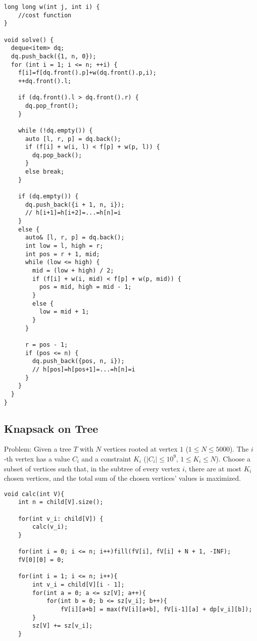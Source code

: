 \documentclass[11pt,a4paper]{article}
\begin{document}
\begin{multicols*}{2}
\begin{lstlisting}
long long w(int j, int i) {
    //cost function
}

void solve() {
  deque<item> dq;
  dq.push_back({1, n, 0});
  for (int i = 1; i <= n; ++i) {
    f[i]=f[dq.front().p]+w(dq.front().p,i);
    ++dq.front().l;

    if (dq.front().l > dq.front().r) {
      dq.pop_front();
    }

    while (!dq.empty()) {
      auto [l, r, p] = dq.back();
      if (f[i] + w(i, l) < f[p] + w(p, l)) {
        dq.pop_back();
      }
      else break;
    }

    if (dq.empty()) {
      dq.push_back({i + 1, n, i});
      // h[i+1]=h[i+2]=...=h[n]=i
    }
    else {
      auto& [l, r, p] = dq.back();
      int low = l, high = r;
      int pos = r + 1, mid;
      while (low <= high) {
        mid = (low + high) / 2;
        if (f[i] + w(i, mid) < f[p] + w(p, mid)) {
          pos = mid, high = mid - 1;
        }
        else {
          low = mid + 1;
        }
      }

      r = pos - 1;
      if (pos <= n) {
        dq.push_back({pos, n, i});
        // h[pos]=h[pos+1]=...=h[n]=i
      }
    }
  }
}
\end{lstlisting}


\subsection{Knapsack on Tree}
Problem: Given a tree $T$ with $N$ vertices rooted at vertex $1$ 
($1 \leq N \leq 5000$). 
The $i$-th vertex has a value $C_i$ and a constraint $K_i$ 
($|C_i| \leq 10^9$, $1 \leq K_i \leq N$). 
Choose a subset of vertices such that, in the subtree of every vertex $i$, 
there are at most $K_i$ chosen vertices, and the total sum of the chosen 
vertices' values is maximized.

\begin{lstlisting}
void calc(int V){
    int n = child[V].size();

    for(int v_i: child[V]) {
        calc(v_i);
    }

    for(int i = 0; i <= n; i++)fill(fV[i], fV[i] + N + 1, -INF);    
    fV[0][0] = 0;                                                   

    for(int i = 1; i <= n; i++){
        int v_i = child[V][i - 1];
        for(int a = 0; a <= sz[V]; a++){        
            for(int b = 0; b <= sz[v_i]; b++){
                fV[i][a+b] = max(fV[i][a+b], fV[i-1][a] + dp[v_i][b]);  
        }
        sz[V] += sz[v_i];
    }


\end{lstlisting}
\end{multicols*}
\end{document}
